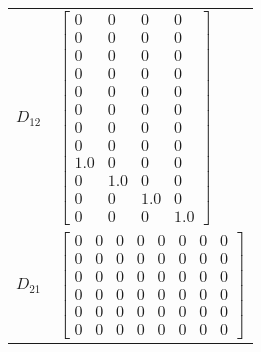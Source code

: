\begin{tabular}{cl}
 $D_{12}$ & $\left[\begin{matrix}0 & 0 & 0 & 0\\0 & 0 & 0 & 0\\0 & 0 & 0 & 0\\0 & 0 & 0 & 0\\0 & 0 & 0 & 0\\0 & 0 & 0 & 0\\0 & 0 & 0 & 0\\0 & 0 & 0 & 0\\1.0 & 0 & 0 & 0\\0 & 1.0 & 0 & 0\\0 & 0 & 1.0 & 0\\0 & 0 & 0 & 1.0\end{matrix}\right]$                                                                                                                                                                                                                                                                                                                                                                                                                                                                                                                                       \\
 $D_{21}$ & $\left[\begin{matrix}0 & 0 & 0 & 0 & 0 & 0 & 0 & 0\\0 & 0 & 0 & 0 & 0 & 0 & 0 & 0\\0 & 0 & 0 & 0 & 0 & 0 & 0 & 0\\0 & 0 & 0 & 0 & 0 & 0 & 0 & 0\\0 & 0 & 0 & 0 & 0 & 0 & 0 & 0\\0 & 0 & 0 & 0 & 0 & 0 & 0 & 0\end{matrix}\right]$                                                                                                                                                                                                                                                                                                                                                                                                                                                                                                                                         \\
\hline
\end{tabular}
